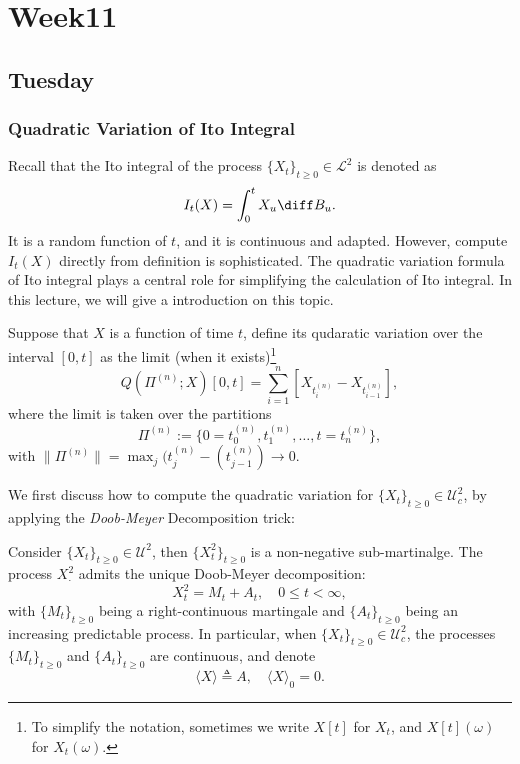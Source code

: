 
\chapter{Week11}

\section{Tuesday}

\subsection{Quadratic Variation of Ito Integral}
Recall that the Ito integral of the process $\{X_t\}_{t\ge0}\in\mathcal{L}^2$ is denoted as
\[
I_t(X)=\int_0^tX_u\diff B_u.
\]
It is a random function of $t$, and it is continuous and adapted.
However, compute $I_t(X)$ directly from definition is sophisticated.
The quadratic variation formula of Ito integral plays a central role for simplifying the calculation of Ito integral.
In this lecture, we will give a introduction on this topic.

\begin{definition}
Suppose that $X$ is a function of time $t$, define its qudaratic variation over the interval $[0,t]$ as the limit (when it exists)\footnote{To simplify the notation, sometimes we write $X[t]$ for $X_t$, and $X[t](\omega)$ for $X_t(\omega)$.}
\begin{equation}
Q(\Pi^{(n)};X)[0,t]=\sum_{i=1}^n[X_{t_i^{(n)}}-X_{t_{i-1}^{(n)}}],
\end{equation}
where the limit is taken over the partitions \[\Pi^{(n)}:=\{0=t_0^{(n)}, t_1^{(n)},\ldots,t=t_n^{(n)}\},\] with $\|\Pi^{(n)}\|=\max_j(t_j^{(n)}-(t_{j-1}^{(n)})\to0$.
\end{definition}

We first discuss how to compute the quadratic variation for $\{X_t\}_{t\ge0}\in\mathcal{U}_c^2$, by applying the \emph{Doob-Meyer} Decomposition trick:
\begin{definition}
Consider $\{X_t\}_{t\ge0}\in\mathcal{U}^2$, then $\{X_t^2\}_{t\ge0}$ is a non-negative sub-martinalge.
The process $X^2_{\cdot}$ admits the unique Doob-Meyer decomposition:
\[
X_t^2=M_t+A_t,\quad 0\le t<\infty,
\]
with $\{M_t\}_{t\ge0}$ being a right-continuous martingale and $\{A_t\}_{t\ge0}$ being an increasing predictable process.
In particular, when $\{X_t\}_{t\ge0}\in\mathcal{U}_c^2$, the processes $\{M_t\}_{t\ge0}$ and $\{A_t\}_{t\ge0}$ are continuous, and denote 
\[
\langle X\rangle \triangleq A,\quad \langle X\rangle_0=0.
\]
\end{definition}


